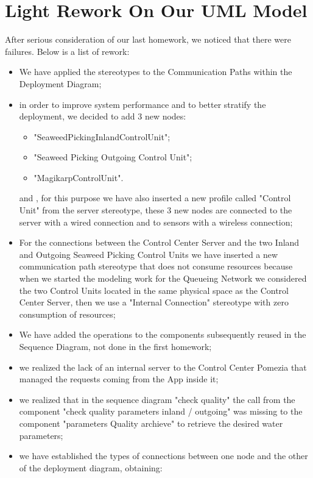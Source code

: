\chapter{\textbf{Light Rework On Our UML Model}}

After serious consideration of our last homework, we noticed that there were failures. Below is a list of rework:

\begin{itemize}
	\item We have applied the stereotypes to the Communication Paths 		within the Deployment Diagram;
	\item in order to improve system performance and to better 				stratify the deployment, we decided to add 3 new nodes: 
	\begin{itemize}
	\item "SeaweedPickingInlandControlUnit";
	\item "Seaweed Picking Outgoing Control Unit";
	\item "MagikarpControlUnit".
	\end{itemize}					 
	and , for this purpose we have also inserted a new profile called 		"Control Unit" from the	server 	stereotype, these 3 new nodes are 		connected to the server with a wired connection and to sensors 			with a wireless connection;
	\item For the connections between the Control Center Server and 		the	two Inland and Outgoing Seaweed Picking Control Units we 			have inserted a new communication path stereotype that does 			not consume resources because when we started the modeling 				work for the Queueing Network we considered the two Control 			Units located in the same physical space as the Control 				Center Server, then we use a "Internal Connection" stereotype with 	zero consumption of resources;
	\item We have added the operations to the components subsequently 		reused in the Sequence Diagram, not done in the first homework;
	\item we realized the lack of an internal server to the Control 		Center 	Pomezia that managed the requests coming from the App 			inside it;
	\item we realized that in the sequence diagram "check quality" the 	call from the component "check quality parameters inland /				outgoing" was missing to the component "parameters Quality 				archieve" to retrieve the desired water parameters;
	\item we have established the types of connections between one 			node and the other of the deployment diagram, obtaining:
	

\end{itemize}
